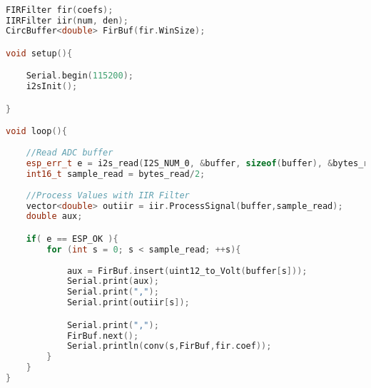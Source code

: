 \begin{lstlisting}[language=C++, caption=Main.cpp]

FIRFilter fir(coefs);
IIRFilter iir(num, den);
CircBuffer<double> FirBuf(fir.WinSize);

void setup(){

    Serial.begin(115200);
    i2sInit();

}

void loop(){
    
    //Read ADC buffer
    esp_err_t e = i2s_read(I2S_NUM_0, &buffer, sizeof(buffer), &bytes_read, portMAX_DELAY);
    int16_t sample_read = bytes_read/2;
   
    //Process Values with IIR Filter
    vector<double> outiir = iir.ProcessSignal(buffer,sample_read);
    double aux;

    if( e == ESP_OK ){
        for (int s = 0; s < sample_read; ++s){
            
            aux = FirBuf.insert(uint12_to_Volt(buffer[s]));
            Serial.print(aux);
            Serial.print(",");
            Serial.print(outiir[s]);

            Serial.print(",");
            FirBuf.next();
            Serial.println(conv(s,FirBuf,fir.coef));
        }
    }
}
\end{lstlisting}

